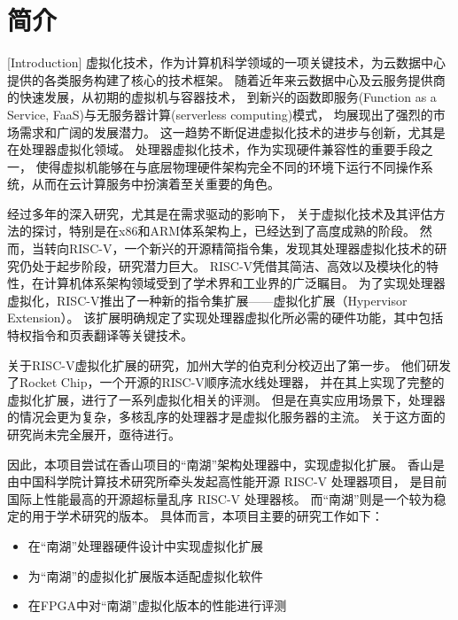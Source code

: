 \chapter{简介}[Introduction]
虚拟化技术，作为计算机科学领域的一项关键技术，为云数据中心提供的各类服务构建了核心的技术框架。
随着近年来云数据中心及云服务提供商的快速发展，从初期的虚拟机与容器技术，
到新兴的函数即服务(Function as a Service, FaaS)与无服务器计算(serverless computing)模式，
均展现出了强烈的市场需求和广阔的发展潜力。
这一趋势不断促进虚拟化技术的进步与创新，尤其是在处理器虚拟化领域。
处理器虚拟化技术，作为实现硬件兼容性的重要手段之一，
使得虚拟机能够在与底层物理硬件架构完全不同的环境下运行不同操作系统，从而在云计算服务中扮演着至关重要的角色。

经过多年的深入研究，尤其是在需求驱动的影响下，
关于虚拟化技术及其评估方法的探讨，特别是在x86和ARM体系架构上，已经达到了高度成熟的阶段。
然而，当转向RISC-V，一个新兴的开源精简指令集，发现其处理器虚拟化技术的研究仍处于起步阶段，研究潜力巨大。
RISC-V凭借其简洁、高效以及模块化的特性，在计算机体系架构领域受到了学术界和工业界的广泛瞩目。
为了实现处理器虚拟化，RISC-V推出了一种新的指令集扩展——虚拟化扩展（Hypervisor Extension）。
该扩展明确规定了实现处理器虚拟化所必需的硬件功能，其中包括特权指令和页表翻译等关键技术。

关于RISC-V虚拟化扩展的研究，加州大学的伯克利分校迈出了第一步。
他们研发了Rocket Chip，一个开源的RISC-V顺序流水线处理器，
并在其上实现了完整的虚拟化扩展，进行了一系列虚拟化相关的评测。
但是在真实应用场景下，处理器的情况会更为复杂，多核乱序的处理器才是虚拟化服务器的主流。
关于这方面的研究尚未完全展开，亟待进行。

因此，本项目尝试在香山项目的“南湖”架构处理器中，实现虚拟化扩展。
香山是由中国科学院计算技术研究所牵头发起高性能开源 RISC-V 处理器项目，
是目前国际上性能最高的开源超标量乱序 RISC-V 处理器核。
而“南湖”则是一个较为稳定的用于学术研究的版本。
具体而言，本项目主要的研究工作如下：
\begin{itemize}
    \item 在“南湖”处理器硬件设计中实现虚拟化扩展
    \item 为“南湖”的虚拟化扩展版本适配虚拟化软件
    \item 在FPGA中对“南湖”虚拟化版本的性能进行评测
\end{itemize}